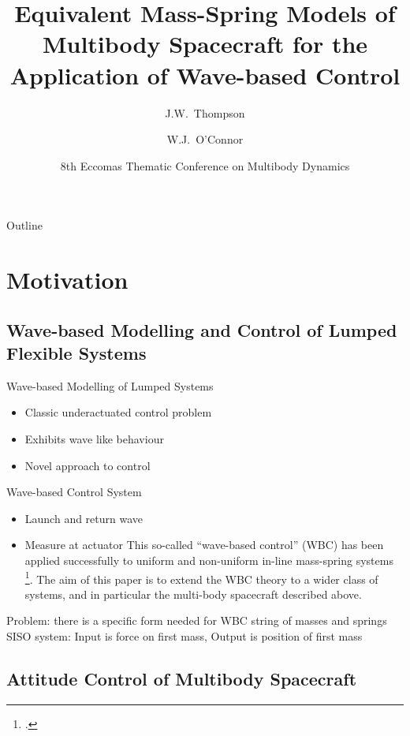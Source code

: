 \documentclass{beamer}
\title[Equivalent Mass-Spring Models]{Equivalent Mass-Spring Models of Multibody Spacecraft for the Application of Wave-based Control}
\author{J.W.~Thompson \and W.J.~O'Connor}
\institute[UCD]{University College Dublin}
\date[MBD 2017] %
{8th Eccomas Thematic Conference on Multibody Dynamics}
\begin{document}
\begin{frame}
  \titlepage
\end{frame}
\begin{frame}{Outline}
  \tableofcontents
\end{frame}

\section{Motivation}

\subsection{Wave-based Modelling and Control of Lumped Flexible Systems}

\begin{frame}{Wave-based Modelling of Lumped Systems}
  \begin{itemize}
  \item
   	Classic underactuated control problem
  \item
    Exhibits wave like behaviour
  \item
  	Novel approach to control
  \end{itemize}
\end{frame}

\begin{frame}{Wave-based Control System}
  \begin{itemize}
  \item
    Launch and return wave
  \item
    Measure at actuator
    This so-called “wave-based control” (WBC) has been applied successfully to uniform and non-uniform in-line mass-spring systems \footcite{OConnor1998,OConnor2011}.
The aim of this paper is to extend the WBC theory to a wider class of systems, and in particular the multi-body spacecraft described above.
  \end{itemize}
      Problem: there is a specific form needed for WBC
    string of masses and springs
    SISO system: Input is force on first mass, Output is position of first mass
\end{frame}

\subsection{Attitude Control of Multibody Spacecraft}
\end{document}
